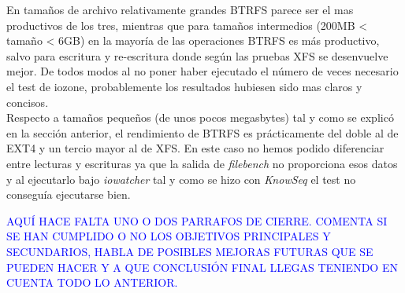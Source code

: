 En tamaños de archivo relativamente grandes BTRFS parece ser el mas productivos de los tres, mientras que para tamaños intermedios (200MB < tamaño < 6GB) en la mayoría de las operaciones BTRFS es más productivo, salvo para escritura y re-escritura donde según las pruebas XFS se desenvuelve mejor. De todos modos al no poner haber ejecutado el número de veces necesario el test de iozone, probablemente los resultados hubiesen sido mas claros y concisos.\\

Respecto a tamaños pequeños (de unos pocos megasbytes) tal y como se explicó en la sección anterior, el rendimiento de BTRFS es prácticamente del doble al de EXT4 y un tercio mayor al de XFS. En este caso no hemos podido diferenciar entre lecturas y escrituras ya que la salida de \textit{filebench} no proporciona esos datos y al ejecutarlo bajo \textit{iowatcher} tal y como se hizo con \textit{KnowSeq} el test no conseguía ejecutarse bien.

\textcolor{blue}{AQUÍ HACE FALTA UNO O DOS PARRAFOS DE CIERRE. COMENTA SI SE HAN CUMPLIDO O NO LOS OBJETIVOS PRINCIPALES Y SECUNDARIOS, HABLA DE POSIBLES MEJORAS FUTURAS QUE SE PUEDEN HACER Y A QUE CONCLUSIÓN FINAL LLEGAS TENIENDO EN CUENTA TODO LO ANTERIOR.}